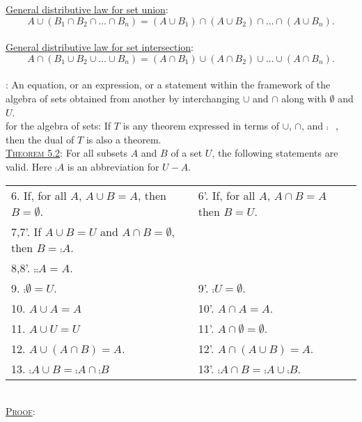 \documentclass[12pt]{book}
\begin{document}
\underline{General distributive law for set union}: $$A \cup (B_1 \cap B_2 \cap \dots \cap B_n) = (A \cup B_1) \cap (A \cup B_2) \cap \dots \cap (A \cup B_n).$$\\

\underline{General distributive law for set intersection}: $$A \cap (B_1 \cup B_2 \cup \dots \cup B_n) = (A \cap B_1) \cup (A \cap B_2) \cup \dots \cup (A \cap B_n).$$\\

: An equation, or an expression, or a statement within the framework of the algebra of sets obtained from another by interchanging $\cup$ and $\cap$ along with $\emptyset$ and $U$.\\

 for the algebra of sets: If $T$ is any theorem expressed in terms of $\cup$, $\cap$, and $\comp{\phantom{A}}$, then the dual of $T$ is also a theorem.\\

\underline{\textsc{Theorem 5.2}}: For all subsets $A$ and $B$ of a set $U$, the following statements are valid. Here $\comp{A}$ is an abbreviation for $U - A$.\\
\begin{tabular}{ll}
6. If, for all $A$, $A \cup B = A$, then $B = \emptyset$.& 6'. If, for all $A$, $A \cap B = A$ then $B = U$.\\
7,7'. If $A \cup B = U$ and $A \cap B = \emptyset$, then $B = \comp{A}$.\\
8,8'. $\comp{\comp{A}} = A$.\\
9. $\comp{\emptyset} = U$.& 9'. $\comp{U} = \emptyset$.\\
10. $A \cup A = A$& 10'. $A \cap A = A$.\\
11. $A \cup U = U$& 11'. $A \cap \emptyset = \emptyset$.\\
12. $A \cup (A \cap B) = A$. &12'. $A \cap (A \cup B) = A$.\\
13. $\comp{A \cup B} = \comp{A} \cap \comp{B}$& 13'. $\comp{A \cap B} = \comp{A} \cup \comp{B}$.
\end{tabular}\\
\underline{\textsc{Proof}}:\\
\end{document}
